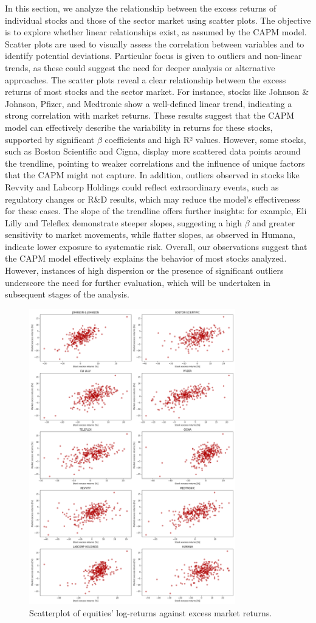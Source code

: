 In this section, we analyze the relationship between the excess returns of individual stocks and those of the sector market
using scatter plots.
The objective is to explore whether linear relationships exist, as assumed by the CAPM model. 
Scatter plots are used to visually assess the correlation between variables and to identify potential deviations.
Particular focus is given to outliers and non-linear trends, as these could suggest the need for deeper analysis or
alternative approaches.
The scatter plots reveal a clear relationship between the excess returns of most stocks and the sector market.
For instance, stocks like Johnson \& Johnson, Pfizer, and Medtronic show a well-defined linear trend, indicating a strong 
correlation with market returns. 
These results suggest that the CAPM model can effectively describe the variability in returns for these stocks, supported by
significant $\beta$ coefficients and high R² values.
However, some stocks, such as Boston Scientific and Cigna, display more scattered data points around the trendline, 
pointing to weaker correlations and the influence of unique factors that the CAPM might not capture.
In addition, outliers observed in stocks like Revvity and Labcorp Holdings could reflect extraordinary events, such as 
regulatory changes or R\&D results, which may reduce the model's effectiveness for these cases.
The slope of the trendline offers further insights: for example, Eli Lilly and Teleflex demonstrate steeper slopes,
suggesting a high $\beta$ and greater sensitivity to market movements, while flatter slopes, as observed in Humana, indicate lower 
exposure to systematic risk.
Overall, our observations suggest that the CAPM model effectively explains the behavior of most stocks analyzed. 
However, instances of high dispersion or the presence of significant outliers underscore the need for further evaluation, 
which will be undertaken in subsequent stages of the analysis.


\begin{figure}[h]
    \centering
    \includegraphics[width=0.8\textwidth]{images/equities_scatterplot.png}
    \caption{Scatterplot of equities' log-returns against excess market returns.}\label{fig:equities_scatterplot}
\end{figure}